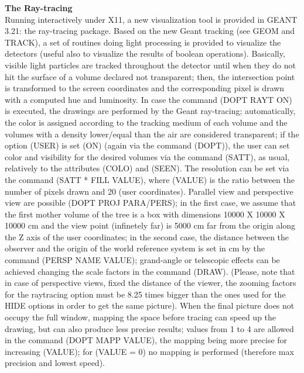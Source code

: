 \oddsidemargin 0.54cm
\evensidemargin 0.0cm
\topmargin -50pt
\textheight 22.5cm 


\pagestyle{plain}
\rm
\Large
{\bf The Ray-tracing}
\\[2em]
\large
\rm
Running interactively under X11, a new visualization tool is provided in
GEANT 3.21: the ray-tracing package. Based on the new Geant tracking (see
GEOM and TRACK), a set of routines doing light processing is provided to
visualize the detectors (useful also to visualize the results of boolean
operations).
Basically, visible light particles are tracked
throughout the detector until when they do not hit the surface of a volume
declared not transparent; then, the intersection point is transformed to 
the screen coordinates and the corresponding pixel is drawn with a computed 
hue and luminosity. 
In case the command (DOPT RAYT ON) is executed,
the drawings are performed by the Geant ray-tracing;
automatically, the color is assigned according to the tracking medium of each
volume and the volumes with a density lower/equal than the air are considered
transparent; if the option (USER) is set (ON) (again via the command (DOPT)),
the user can set color and visibility for the desired volumes via the command
(SATT), as usual, relatively to the attributes (COLO) and (SEEN).
The resolution can be set via the command (SATT * FILL VALUE), where (VALUE)
is the ratio between the number of pixels drawn and 20 (user coordinates).
Parallel view and perspective view are possible (DOPT PROJ PARA/PERS); in the
first case, we assume that the first mother volume of the tree is a box with
dimensions 10000 X 10000 X 10000 cm and the view point (infinetely far) is
5000 cm far from the origin along the Z axis of the user coordinates; in the
second case, the distance between the observer and the origin of the world
reference system is set in cm by the command (PERSP NAME VALUE); grand-angle
or telescopic effects can be achieved changing the scale factors in the command
(DRAW). (Please, note that in case of perspective views, fixed the distance of 
the viewer, the zooming factors for the raytracing option must be 8.25 times
bigger than the ones used for the HIDE options in order to get the same
picture).
When the final picture does not occupy the full window,
mapping the space before tracing can speed up the drawing, but can also
produce less precise results; values from 1 to 4 are allowed in the command
(DOPT MAPP VALUE), the mapping being more precise for increasing (VALUE); for
(VALUE = 0) no mapping is performed (therefore max precision and lowest speed).
